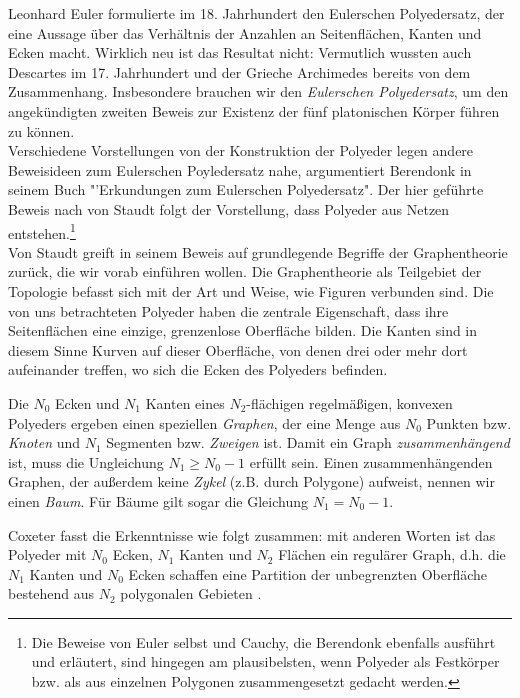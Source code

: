 Leonhard Euler formulierte im 18. Jahrhundert den Eulerschen Polyedersatz, der eine Aussage über das Verhältnis der Anzahlen an Seitenflächen, Kanten und Ecken macht. Wirklich neu ist das Resultat nicht: Vermutlich wussten auch Descartes im 17. Jahrhundert und der Grieche Archimedes bereits von dem Zusammenhang. Insbesondere brauchen wir den \textit{Eulerschen Polyedersatz}, um den angekündigten zweiten Beweis zur Existenz der fünf platonischen Körper führen zu können.\\
Verschiedene Vorstellungen von der Konstruktion der Polyeder legen andere Beweisideen zum Eulerschen Poyledersatz nahe, argumentiert Berendonk in seinem Buch "'Erkundungen zum Eulerschen Polyedersatz". \citep[vgl.][39]{Berendonk2014} Der hier geführte Beweis nach von Staudt folgt der Vorstellung, dass Polyeder aus Netzen entstehen.\footnote{Die Beweise von Euler selbst und Cauchy, die Berendonk ebenfalls ausführt und erläutert, sind hingegen am plausibelsten, wenn Polyeder als Festkörper bzw. als aus einzelnen Polygonen zusammengesetzt gedacht werden.}\\
Von Staudt greift in seinem Beweis auf grundlegende Begriffe der Graphentheorie zurück, die wir vorab einführen wollen. Die Graphentheorie als Teilgebiet der Topologie befasst sich mit der Art und Weise, wie Figuren verbunden sind. Die von uns betrachteten Polyeder haben die zentrale Eigenschaft, dass ihre Seitenflächen eine einzige, grenzenlose Oberfläche bilden. Die Kanten sind in diesem Sinne Kurven auf dieser Oberfläche, von denen drei oder mehr dort aufeinander treffen, wo sich die Ecken des Polyeders befinden. 
\begin{bem} 
Die $N_0$ Ecken und $N_1$ Kanten eines $N_2$-flächigen regelmäßigen, konvexen Polyeders ergeben einen speziellen \textit{Graphen}, der eine Menge aus $N_0$ Punkten bzw. \textit{Knoten} und $N_1$ Segmenten bzw. \textit{Zweigen} ist. Damit ein Graph \textit{zusammenhängend} ist, muss die Ungleichung $N_{1} \geq N_{0}-1$ erfüllt sein. 
Einen zusammenhängenden Graphen, der außerdem keine \textit{Zykel} (z.B. durch Polygone) aufweist, nennen wir einen \textit{Baum}. Für Bäume gilt sogar die Gleichung $N_{1} = N_{0}-1$. 
\end{bem}
Coxeter fasst die Erkenntnisse wie folgt zusammen: mit anderen Worten ist das Polyeder mit $N_0$ Ecken, $N_1$ Kanten und $N_2$ Flächen ein regulärer Graph, d.h. die $N_1$ Kanten und $N_0$ Ecken schaffen eine Partition der unbegrenzten Oberfläche bestehend aus $N_2$ polygonalen Gebieten \citep[6]{Coxeter1973}.\\
